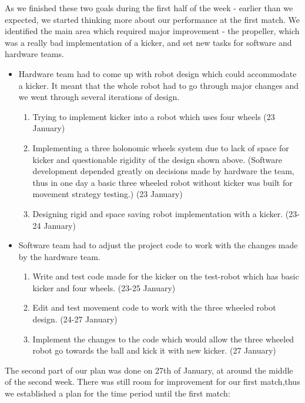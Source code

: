 \documentclass[12pt,oneside]{article}
\begin{document}
			As we finished these two goals during the first half of the week - earlier than we expected,  we started thinking more about our performance at the first match. We identified the main area which required major improvement - the propeller, which was a really bad implementation of a kicker, and set new tasks for software and hardware teams.
			\begin{itemize}
				\item Hardware team had to come up with robot design which could accommodate a kicker. It meant that the whole robot had to go through major changes and we went through several iterations of design.
				\begin{enumerate}
					\item Trying to implement kicker into a robot which uses four wheels (23 January)
					\item Implementing a three holonomic wheels system due to lack of space for kicker and questionable rigidity of the design shown above. (Software development depended greatly on decisions made by hardware the team, thus in one day a basic three wheeled robot without kicker was built for movement strategy testing.) (23 January)
					\item Designing rigid and space saving robot implementation with a kicker. (23-24 January)
				\end{enumerate}
				\item Software team had to adjust the project code to work with the changes made by the hardware team.
				\begin{enumerate}
					\item Write and test code made for the kicker on the test-robot which has basic kicker and four wheels. (23-25 January)
					\item Edit and test movement code to work with the three wheeled robot design. (24-27 January)
					\item Implement the changes to the code which would allow the three wheeled robot go towards the ball and kick it with new kicker. (27 January)
				\end{enumerate}
			\end{itemize}
			The second part of our plan was done on 27th of January, at around the middle of the second week. There was still room for improvement for our first match,thus we established a plan for the time period until the first match:
\end{document}
